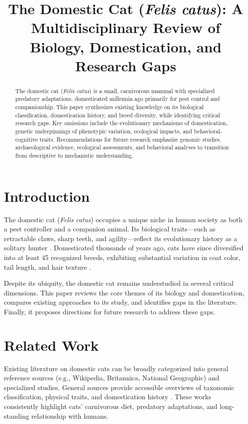 \documentclass{article}
\title{The Domestic Cat (\textit{Felis catus}): A Multidisciplinary Review of Biology, Domestication, and Research Gaps}
\author{}
\date{}
\begin{document}
\maketitle

\begin{abstract}
The domestic cat (\textit{Felis catus}) is a small, carnivorous mammal with specialized predatory adaptations, domesticated millennia ago primarily for pest control and companionship. This paper synthesizes existing knowledge on its biological classification, domestication history, and breed diversity, while identifying critical research gaps. Key omissions include the evolutionary mechanisms of domestication, genetic underpinnings of phenotypic variation, ecological impacts, and behavioral-cognitive traits. Recommendations for future research emphasize genomic studies, archaeological evidence, ecological assessments, and behavioral analyses to transition from descriptive to mechanistic understanding.
\end{abstract}

\section{Introduction}
The domestic cat (\textit{Felis catus}) occupies a unique niche in human society as both a pest controller and a companion animal. Its biological traits—such as retractable claws, sharp teeth, and agility—reflect its evolutionary history as a solitary hunter \cite{biological_traits}. Domesticated thousands of years ago, cats have since diversified into at least 45 recognized breeds, exhibiting substantial variation in coat color, tail length, and hair texture \cite{breed_diversity}.

Despite its ubiquity, the domestic cat remains understudied in several critical dimensions. This paper reviews the core themes of its biology and domestication, compares existing approaches to its study, and identifies gaps in the literature. Finally, it proposes directions for future research to address these gaps.

\section{Related Work}
Existing literature on domestic cats can be broadly categorized into general reference sources (e.g., Wikipedia, Britannica, National Geographic) and specialized studies. General sources provide accessible overviews of taxonomic classification, physical traits, and domestication history \cite{general_sources}. These works consistently highlight cats' carnivorous diet, predatory adaptations, and long-standing relationship with humans.
\end{document}

